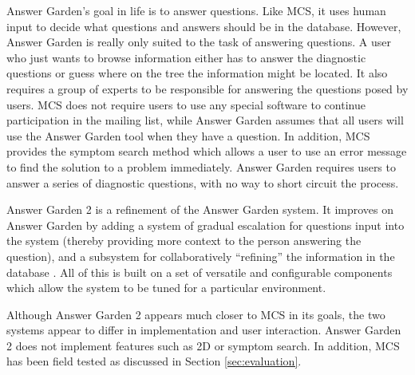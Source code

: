 Answer Garden's goal in life is to answer questions. Like MCS, it uses human
input to decide what questions and answers should be in the database. However,
Answer Garden is really only suited to the task of answering questions. A user
who just wants to browse information either has to answer the diagnostic
questions or guess where on the tree the information might be located. It also
requires a group of experts to be responsible for answering the questions posed
by users. MCS does not require users to use any special software to continue
participation in the mailing list, while Answer Garden assumes that all users
will use the Answer Garden tool when they have a question. In addition, MCS
provides the symptom search method which allows a user to use an error message
to find the solution to a problem immediately.  Answer Garden requires users to
answer a series of diagnostic questions, with no way to short circuit the
process.

Answer Garden 2 is a refinement of the Answer Garden system. It improves on
Answer Garden by adding a system of gradual escalation for questions input into
the system (thereby providing more context to the person answering the
question), and a subsystem for collaboratively ``refining'' the information in
the database \cite{cscw96*97}. All of this is built on a set of versatile and
configurable components which allow the system to be tuned for a particular
environment.

Although Answer Garden 2 appears much closer to MCS in its goals, the two
systems appear to differ in implementation and user interaction. Answer Garden
2 does not implement features such as 2D or symptom search. In addition, MCS
has been field tested as discussed in Section \ref{sec:evaluation}.


